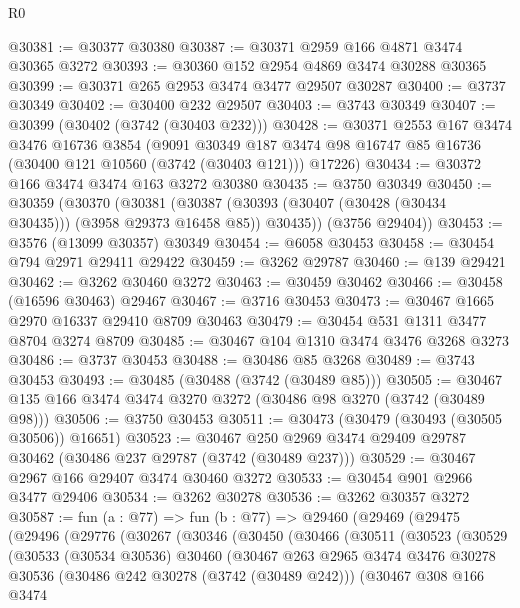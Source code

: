\begin{lexlean}{R0}
\begin{coremodule}
@30381 := @30377 @30380
@30387 := @30371 @2959 @166 @4871 @3474 @30365 @3272
@30393 := @30360 @152 @2954 @4869 @3474 @30288 @30365
@30399 := @30371 @265 @2953 @3474 @3477 @29507 @30287
@30400 := @3737 @30349
@30402 := @30400 @232 @29507
@30403 := @3743 @30349
@30407 := @30399 (@30402 (@3742 (@30403 @232)))
@30428 := @30371
    @2553
    @167
    @3474
    @3476
    @16736
    @3854
    (@9091
      @30349
      @187
      @3474
      @98
      @16747
      @85
      @16736
      (@30400 @121 @10560 (@3742 (@30403 @121)))
      @17226)
@30434 := @30372 @166 @3474 @3474 @163 @3272 @30380
@30435 := @3750 @30349
@30450 := @30359
    (@30370
      (@30381 (@30387 (@30393 (@30407 (@30428 (@30434 @30435))) (@3958 @29373 @16458 @85)) @30435))
      (@3756 @29404))
@30453 := @3576 (@13099 @30357) @30349
@30454 := @6058 @30453
@30458 := @30454 @794 @2971 @29411 @29422
@30459 := @3262 @29787
@30460 := @139 @29421
@30462 := @3262 @30460 @3272
@30463 := @30459 @30462
@30466 := @30458 (@16596 @30463) @29467
@30467 := @3716 @30453
@30473 := @30467 @1665 @2970 @16337 @29410 @8709 @30463
@30479 := @30454 @531 @1311 @3477 @8704 @3274 @8709
@30485 := @30467 @104 @1310 @3474 @3476 @3268 @3273
@30486 := @3737 @30453
@30488 := @30486 @85 @3268
@30489 := @3743 @30453
@30493 := @30485 (@30488 (@3742 (@30489 @85)))
@30505 := @30467 @135 @166 @3474 @3474 @3270 @3272 (@30486 @98 @3270 (@3742 (@30489 @98)))
@30506 := @3750 @30453
@30511 := @30473 (@30479 (@30493 (@30505 @30506)) @16651)
@30523 := @30467 @250 @2969 @3474 @29409 @29787 @30462 (@30486 @237 @29787 (@3742 (@30489 @237)))
@30529 := @30467 @2967 @166 @29407 @3474 @30460 @3272
@30533 := @30454 @901 @2966 @3477 @29406
@30534 := @3262 @30278
@30536 := @3262 @30357 @3272
@30587 := fun (a : @77) =>
  fun (b : @77) =>
  @29460
    (@29469
      (@29475
        (@29496
          (@29776
            (@30267
              (@30346
                (@30450
                  (@30466
                    (@30511
                      (@30523
                        (@30529
                          (@30533
                            (@30534 @30536)
                            @30460
                            (@30467
                              @263
                              @2965
                              @3474
                              @3476
                              @30278
                              @30536
                              (@30486 @242 @30278 (@3742 (@30489 @242)))
                              (@30467
                                @308
                                @166
                                @3474

\end{coremodule}
\end{lexlean}
